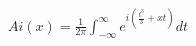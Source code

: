 \documentclass[preview]{standalone}
\begin{document}
\begin{align*}
Ai(x)=\displaystyle \frac{1}{2\pi}\int_{-\infty}^{\infty}e^{i(\frac{t^3}{3}+xt)} dt
\end{align*}
\end{document}
